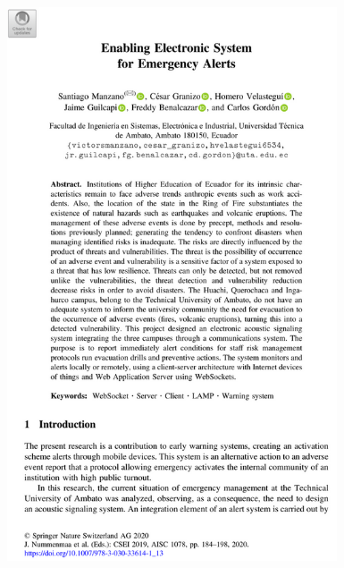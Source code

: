 \begin{figure}[ht]
    \centering
    \includegraphics[width=0.87\textwidth]{5.-Publicaciones/Certificados/2.png}
\end{figure}


